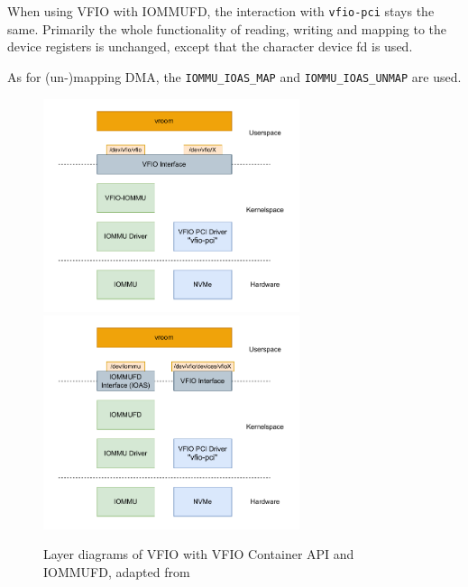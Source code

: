 When using VFIO with IOMMUFD, the interaction with \texttt{vfio-pci} stays the same. Primarily the whole functionality of reading, writing and mapping to the device registers is unchanged, except that the character device fd is used.

As for (un-)mapping DMA, the \texttt{IOMMU\_IOAS\_MAP} and \texttt{IOMMU\_IOAS\_UNMAP} are used.


\begin{figure}[H]
    \centering
     {\includegraphics[width=0.67\textwidth]{figures/VFIOLayer.pdf}}
     {\includegraphics[width=0.67\textwidth]{figures/IOMMUFDLayer.pdf}}
    \caption{Layer diagrams of VFIO with VFIO Container API and IOMMUFD, adapted from \cite{dpdkiommufd}}
    \label{fig:layer}
\end{figure}

